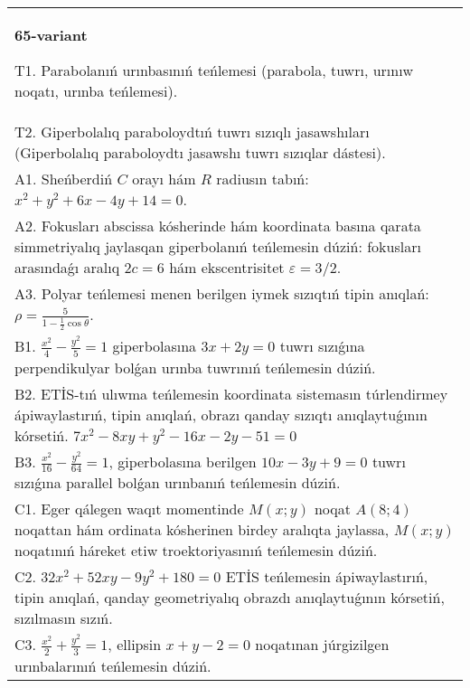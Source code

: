 \documentclass{article}
\begin{document}
\begin{tabular}{m{17cm}}
\textbf{65-variant}
\newline

T1. Parabolanıń urınbasınıń teńlemesi (parabola, tuwrı, urınıw noqatı, urınba teńlemesi).\\

T2. Giperbolalıq paraboloydtıń tuwrı sızıqlı jasawshıları (Giperbolalıq paraboloydtı jasawshı tuwrı sızıqlar dástesi).\\

A1. Sheńberdiń $C$ orayı hám $R$ radiusın tabıń: $x^2+y^2+6 x-4 y+14=0$.\\

A2. Fokusları abscissa kósherinde hám koordinata basına qarata simmetriyalıq jaylasqan giperbolanıń teńlemesin dúziń: fokusları arasındaǵı aralıq $2 c=6$ hám ekscentrisitet $\varepsilon=3/2$.\\

A3. Polyar teńlemesi menen berilgen iymek sızıqtıń tipin anıqlań: $\rho=\frac{5}{1-\frac{1}{2}\cos\theta}$.\\

B1. $\frac{x^{2}}{4} - \frac{y^{2}}{5} = 1$ giperbolasına $3x + 2y = 0$ tuwrı sızıǵına perpendikulyar bolǵan urınba tuwrınıń teńlemesin dúziń.\\

B2. ETİS-tıń ulıwma teńlemesin koordinata sistemasın túrlendirmey ápiwaylastırıń, tipin anıqlań, obrazı qanday sızıqtı anıqlaytuǵının kórsetiń. $7x^{2} - 8xy + y^{2} - 16x - 2y - 51 = 0$  \\

B3. $\frac{x^{2}}{16} - \frac{y^{2}}{64} = 1$, giperbolasına berilgen $10x - 3y + 9 = 0$ tuwrı sızıǵına parallel bolǵan urınbanıń teńlemesin dúziń.  \\

C1. Eger qálegen waqıt momentinde $M(x;y)$ noqat $A(8;4)$ noqattan hám ordinata kósherinen birdey aralıqta jaylassa, $M(x;y)$ noqatınıń háreket etiw troektoriyasınıń teńlemesin dúziń.  \\

C2. $32x^{2} + 52xy - 9y^{2} + 180 = 0$ ETİS teńlemesin ápiwaylastırıń, tipin anıqlań, qanday geometriyalıq obrazdı anıqlaytuǵının kórsetiń, sızılmasın sızıń.  \\

C3. $\frac{x^{2}}{2} + \frac{y^{2}}{3} = 1$, ellipsin $x + y - 2 = 0$ noqatınan júrgizilgen urınbalarınıń teńlemesin dúziń.  \\

\end{tabular}
\vspace{1cm}
\end{document}
